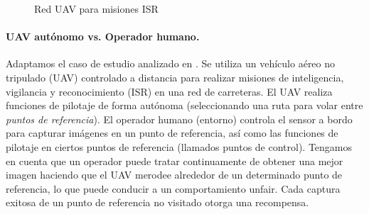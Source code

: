 \begin{figure}
\centering
{}
\caption{Red UAV para misiones ISR} \label{fig:uav_game_map}
\end{figure}
%
\paragraph{UAV autónomo vs. Operador humano.} Adaptamos el caso de estudio analizado en \cite{DBLP:conf/iccps/FengWHT15}. Se utiliza un vehículo aéreo no tripulado (UAV) controlado a distancia para realizar misiones de inteligencia, vigilancia y reconocimiento (ISR) en una red de carreteras. El UAV realiza funciones de pilotaje de forma autónoma (seleccionando una ruta para volar entre \emph{puntos de referencia}). El operador humano (entorno) controla el sensor a bordo para capturar imágenes en un punto de referencia, así como las funciones de pilotaje en ciertos puntos de referencia (llamados puntos de control). Tengamos en cuenta que un operador puede tratar continuamente de obtener una mejor imagen haciendo que el UAV merodee alrededor de un determinado punto de referencia, lo que puede conducir a un comportamiento unfair.
Cada captura exitosa de un punto de referencia no visitado otorga una recompensa.

